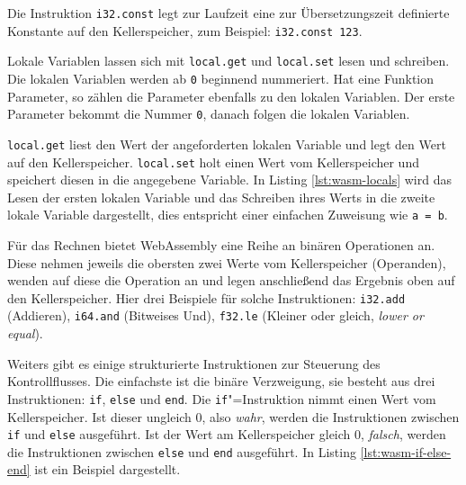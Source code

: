 Die Instruktion \lstinline{i32.const} legt zur Laufzeit eine zur Übersetzungszeit definierte Konstante auf den Kellerspeicher, zum Beispiel: \lstinline{i32.const 123}.

Lokale Variablen lassen sich mit \lstinline{local.get} und \lstinline{local.set} lesen und schreiben. Die lokalen Variablen werden ab \lstinline{0} beginnend nummeriert. Hat eine Funktion Parameter, so zählen die Parameter ebenfalls zu den lokalen Variablen. Der erste Parameter bekommt die Nummer \lstinline{0}, danach folgen die lokalen Variablen.

\lstinline{local.get} liest den Wert der angeforderten lokalen Variable und legt den Wert auf den Kellerspeicher. \lstinline{local.set} holt einen Wert vom Kellerspeicher und speichert diesen in die angegebene Variable. In Listing \ref{lst:wasm-locals} wird das Lesen der ersten lokalen Variable und das Schreiben ihres Werts in die zweite lokale Variable dargestellt, dies entspricht einer einfachen Zuweisung wie \lstinline{a = b}. 



Für das Rechnen bietet WebAssembly eine Reihe an binären Operationen an. Diese nehmen jeweils die obersten zwei Werte vom Kellerspeicher (Operanden), wenden auf diese die Operation an und legen anschließend das Ergebnis oben auf den Kellerspeicher. Hier drei Beispiele für solche Instruktionen: \lstinline{i32.add} (Addieren), \lstinline{i64.and} (Bitweises Und), \lstinline{f32.le} (Kleiner oder gleich, \emph{lower or equal}).

Weiters gibt es einige strukturierte Instruktionen zur Steuerung des Kontrollflusses. Die einfachste ist die binäre Verzweigung, sie besteht aus drei Instruktionen: \lstinline{if}, \lstinline{else} und \lstinline{end}. Die \lstinline{if}"=Instruktion nimmt einen Wert vom Kellerspeicher. Ist dieser ungleich 0, also \emph{wahr}, werden die Instruktionen zwischen \lstinline{if} und \lstinline{else} ausgeführt. Ist der Wert am Kellerspeicher gleich 0, \emph{falsch}, werden die Instruktionen zwischen \lstinline{else} und \lstinline{end} ausgeführt. In Listing \ref{lst:wasm-if-else-end} ist ein Beispiel dargestellt.



